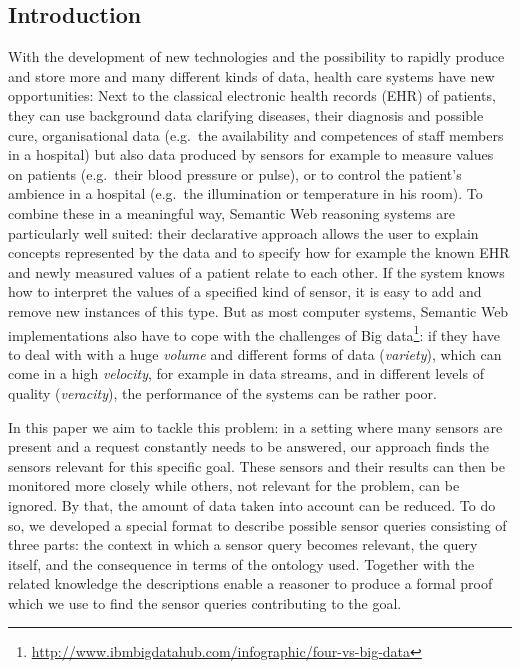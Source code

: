 \subsection{Introduction}
With the development of new technologies 
and the possibility to rapidly produce and store more and many different kinds of data, health care
systems have new opportunities: Next to the classical electronic health records (EHR) of patients, they can
 use background data clarifying diseases, their diagnosis and possible cure, 
 organisational data (e.g.\ the availability and competences of staff members in a hospital)
but also
data produced by sensors for example to measure values on patients (e.g.\
their blood pressure or pulse), or to control the patient's ambience in a hospital (e.g.\ the illumination or temperature in his room).
To combine these in a meaningful way, Semantic Web reasoning systems are particularly well suited: their declarative approach allows the user to 
explain concepts represented by the data and to specify how for example the known EHR and newly measured values of a patient relate to each other.
If the system knows how to interpret the values of a specified kind of sensor, it is easy to add and remove new instances of this type. 
But as most computer systems, Semantic Web implementations also have to cope with the challenges of 
Big data\footnote{\url{http://www.ibmbigdatahub.com/infographic/four-vs-big-data}}: 
if they have to deal with with a huge \emph{volume}  and  different forms of data (\emph{variety}), which can come in a high \emph{velocity}, 
for example in data streams, and in different levels of quality (\emph{veracity}), the performance of the systems can be rather poor.



In this paper we aim to tackle this problem: in a setting where many sensors are present and a request constantly needs to be answered, 
our approach finds the sensors relevant for this specific goal. 
These sensors and their results can then be monitored more closely while others, not relevant for the problem, can be ignored. 
By that, the amount of data taken into account can be reduced.
To do so, we developed a special format to describe possible sensor queries consisting of three parts: the context in which a sensor query becomes relevant, 
the  query itself, and the consequence 
in terms of the ontology used. Together with the related knowledge the descriptions enable a reasoner to produce a formal proof which we %
use
to find the sensor queries contributing to the goal.

